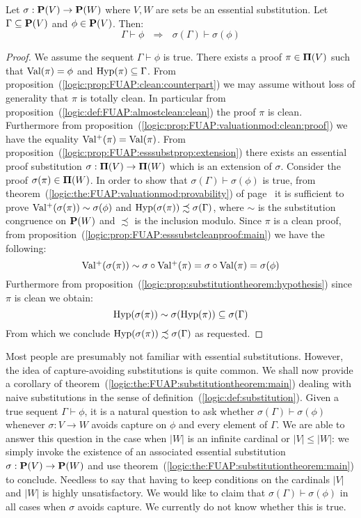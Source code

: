 \begin{theorem} \label{logic:the:FUAP:substitutiontheorem:main}
Let $\sigma:\mbox{${\bf P}(V)$}\to{\bf P}(W)$ where $V,W$ are sets be an essential
substitution. Let $\Gamma\subseteq\mbox{${\bf P}(V)$}$ and $\phi\in\mbox{${\bf P}(V)$}$. Then:
    \[
    \Gamma\vdash\phi\ \ \ \Rightarrow\ \ \ \sigma(\Gamma)\vdash\sigma(\phi)
    \]
\end{theorem}
\begin{proof}
We assume the sequent $\Gamma\vdash\phi$ is true. There exists a
proof $\pi\in\mbox{${\bf\Pi}(V)$}$ such that $\mbox{\rm Val}(\pi)=\phi$ and
$\mbox{\rm Hyp}(\pi)\subseteq\Gamma$. From
proposition~(\ref{logic:prop:FUAP:clean:counterpart}) we may assume
without loss of generality that $\pi$ is totally clean. In
particular from proposition~(\ref{logic:def:FUAP:almostclean:clean})
the proof $\pi$ is clean. Furthermore from
proposition~(\ref{logic:prop:FUAP:valuationmod:clean:proof}) we have
the equality $\mbox{$\rm Val^{+}$}(\pi)=\mbox{\rm Val}(\pi)$. From
proposition~(\ref{logic:prop:FUAP:esssubstprop:extension}) there
exists an essential proof substitution $\sigma:\mbox{${\bf\Pi}(V)$}\to{\bf\Pi}(W)$
which is an extension of $\sigma$. Consider the proof
$\sigma(\pi)\in{\bf\Pi}(W)$. In order to show that
$\sigma(\Gamma)\vdash\sigma(\phi)$ is true, from
theorem~(\ref{logic:the:FUAP:valuationmod:provability}) of
page~\pageref{logic:the:FUAP:valuationmod:provability} it is
sufficient to prove $\mbox{$\rm Val^{+}$}(\sigma(\pi))\sim\sigma(\phi)$ and
$\mbox{\rm Hyp}(\sigma(\pi))\precsim\sigma(\Gamma)$, where $\sim$ is the
substitution congruence on ${\bf P}(W)$ and $\precsim$ is the
inclusion modulo. Since $\pi$ is a clean proof, from
proposition~(\ref{logic:prop:FUAP:esssubstcleanproof:main}) we have
the following:
    \[
    \mbox{$\rm Val^{+}$}(\sigma(\pi))\sim\sigma\circ\mbox{$\rm Val^{+}$}(\pi)=\sigma\circ\mbox{\rm Val}(\pi)=\sigma(\phi)
    \]
Furthermore from
proposition~(\ref{logic:prop:substitutiontheorem:hypothesis}) since
$\pi$ is clean we obtain:
    \[
    \mbox{\rm Hyp}(\sigma(\pi))\sim\sigma(\mbox{\rm Hyp}(\pi))\subseteq\sigma(\Gamma)
    \]
From which we conclude $\mbox{\rm Hyp}(\sigma(\pi))\precsim\sigma(\Gamma)$ as
requested.
\end{proof}

Most people are presumably not familiar with essential
substitutions. However, the idea of capture-avoiding substitutions
is quite common. We shall now provide a corollary of
theorem~(\ref{logic:the:FUAP:substitutiontheorem:main}) dealing with
naive substitutions in the sense of
definition~(\ref{logic:def:substitution}). Given a true sequent
$\Gamma\vdash\phi$, it is a natural question to ask whether
$\sigma(\Gamma)\vdash\sigma(\phi)$ whenever $\sigma:V\to W$ avoids
capture on $\phi$ and every element of $\Gamma$. We are able to
answer this question in the case when $|W|$ is an infinite cardinal
or $|V|\leq|W|$: we simply invoke the existence of an associated
essential substitution $\sigma:\mbox{${\bf P}(V)$}\to{\bf P}(W)$ and use
theorem~(\ref{logic:the:FUAP:substitutiontheorem:main}) to conclude.
Needless to say that having to keep conditions on the cardinals
$|V|$ and $|W|$ is highly unsatisfactory. We would like to claim
that $\sigma(\Gamma)\vdash\sigma(\phi)$ in all cases when $\sigma$
avoids capture. We currently do not know whether this is true.

